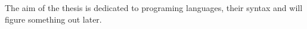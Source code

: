 The aim of the thesis is dedicated to programing languages, their syntax and will figure something out later.

